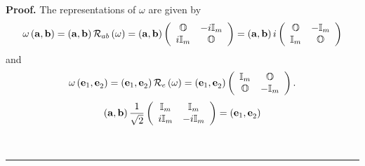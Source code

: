\documentclass[aps,preprint]{revtex4}%
\newenvironment{proof}[1][Proof]{\noindent\textbf{#1.} }{\ \rule{0.5em}{0.5em}}
\begin{document}
\begin{proof}
The representations of $\omega$ are given by
\begin{equation}
\omega\left(  \mathbf{a,b}\right)  =\left(  \mathbf{a,b}\right)
\mathcal{R}_{ab}\left(  \omega\right)  =\left(  \mathbf{a,b}\right)  \left(
\begin{array}
[c]{cc}%
\mathbb{O} & -i\mathbb{I}_{m}\\
i\mathbb{I}_{m} & \mathbb{O}%
\end{array}
\right)  =\left(  \mathbf{a,b}\right)  i\left(
\begin{array}
[c]{cc}%
\mathbb{O} & -\mathbb{I}_{m}\\
\mathbb{I}_{m} & \mathbb{O}%
\end{array}
\right)
\end{equation}
and%
\begin{equation}
\omega\left(  \mathbf{e}_{1}\mathbf{,e}_{2}\right)  =\left(  \mathbf{e}%
_{1}\mathbf{,e}_{2}\right)  \mathcal{R}_{e}\left(  \omega\right)  =\left(
\mathbf{e}_{1}\mathbf{,e}_{2}\right)  \left(
\begin{array}
[c]{cc}%
\mathbb{I}_{m} & \mathbb{O}\\
\mathbb{O} & -\mathbb{I}_{m}%
\end{array}
\right)  .
\end{equation}%
\begin{equation}
\left(  \mathbf{a,b}\right)  \frac{1}{\sqrt{2}}\left(
\begin{array}
[c]{cc}%
\mathbb{I}_{m} & \mathbb{I}_{m}\\
i\mathbb{I}_{m} & -i\mathbb{I}_{m}%
\end{array}
\right)  =\left(  \mathbf{e}_{1}\mathbf{,e}_{2}\right)
\end{equation}

\end{proof}
\end{document}
